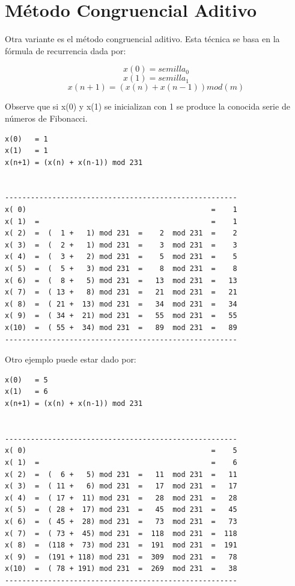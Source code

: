 \section{Método Congruencial Aditivo}

Otra variante es el método congruencial aditivo. Esta técnica se basa en la fórmula de recurrencia dada por:

$$x(0)   = semilla_0$$
$$x(1)   = semilla_1$$
$$x(n+1) = (x(n) + x(n-1)) mod (m)$$


Observe que si x(0) y x(1) se inicializan con 1 se produce la conocida serie de números de Fibonacci.

\begin{verbatim}
x(0)   = 1
x(1)   = 1
x(n+1) = (x(n) + x(n-1)) mod 231


------------------------------------------------------
x( 0)                                           =    1
x( 1)  =                                        =    1
x( 2)  =  (  1 +   1) mod 231  =    2  mod 231  =    2
x( 3)  =  (  2 +   1) mod 231  =    3  mod 231  =    3
x( 4)  =  (  3 +   2) mod 231  =    5  mod 231  =    5
x( 5)  =  (  5 +   3) mod 231  =    8  mod 231  =    8
x( 6)  =  (  8 +   5) mod 231  =   13  mod 231  =   13
x( 7)  =  ( 13 +   8) mod 231  =   21  mod 231  =   21
x( 8)  =  ( 21 +  13) mod 231  =   34  mod 231  =   34
x( 9)  =  ( 34 +  21) mod 231  =   55  mod 231  =   55
x(10)  =  ( 55 +  34) mod 231  =   89  mod 231  =   89
------------------------------------------------------
\end{verbatim}


Otro ejemplo puede estar dado por:

\begin{verbatim}
x(0)   = 5
x(1)   = 6
x(n+1) = (x(n) + x(n-1)) mod 231


------------------------------------------------------
x( 0)                                           =    5
x( 1)  =                                        =    6
x( 2)  =  (  6 +   5) mod 231  =   11  mod 231  =   11
x( 3)  =  ( 11 +   6) mod 231  =   17  mod 231  =   17
x( 4)  =  ( 17 +  11) mod 231  =   28  mod 231  =   28
x( 5)  =  ( 28 +  17) mod 231  =   45  mod 231  =   45
x( 6)  =  ( 45 +  28) mod 231  =   73  mod 231  =   73
x( 7)  =  ( 73 +  45) mod 231  =  118  mod 231  =  118
x( 8)  =  (118 +  73) mod 231  =  191  mod 231  =  191
x( 9)  =  (191 + 118) mod 231  =  309  mod 231  =   78
x(10)  =  ( 78 + 191) mod 231  =  269  mod 231  =   38
------------------------------------------------------
\end{verbatim}



